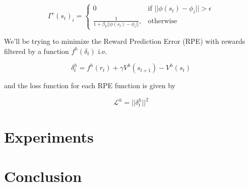 \documentclass{article}
\begin{document}
\begin{equation}
\Gamma^\epsilon(s_t)_i = 
\begin{cases}
    0 & \text{if } ||\phi(s_t)-\phi_i||>\epsilon\\
     \frac{1}{1+\beta_V ||\phi(s_t)-\phi_i||},         & \text{otherwise}
\end{cases}
\end{equation}

We'll be trying to minimize the Reward Prediction Error (RPE) with rewards filtered by a function $f^h(\delta_t)$ i.e.

\begin{equation}
  \delta^h_t = f^h(r_t) + \gamma V^h(s_{t+1})-V^h(s_t)
\end{equation}

and the loss function for each RPE function is given by

\begin{equation}
  \mathcal{L}^h = ||\delta^h_t||^2
\end{equation}


\section{Experiments}

\section{Conclusion}

% 
% 
\end{document}
